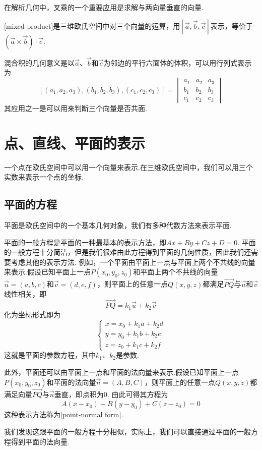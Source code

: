 在解析几何中，叉乘的一个重要应用是求解与两向量垂直的向量.
\begin{definition}[向量的混合积]
    [mixed product]是三维欧氏空间中对三个向量的运算，用$[\vec{a},\vec{b},\vec{c}]$表示，等价于$(\vec{a}\times\vec{b})\cdot\vec{c}$.
\end{definition}
混合积的几何意义是以$\vec{a}$、$\vec{b}$和$\vec{c}$为邻边的平行六面体的体积，可以用行列式表示为
$$[(a_1,a_2,a_3),(b_1,b_2,b_3),(c_1,c_2,c_3)]=\begin{vmatrix}
    a_1&a_2&a_3\\
    b_1&b_2&b_3\\
    c_1&c_2&c_3
\end{vmatrix}$$
其应用之一是可以用来判断三个向量是否共面.
\section{点、直线、平面的表示}
一个点在欧氏空间中可以用一个向量来表示.在三维欧氏空间中，我们可以用三个实数来表示一个点的坐标.

\subsection{平面的方程}
平面是欧氏空间中的一个基本几何对象，我们有多种代数方法来表示平面.

平面的一般方程是平面的一种最基本的表示方法，即$Ax+By+Cz+D=0$.
平面的一般方程十分简洁，但是我们很难由此方程得到平面的几何性质，因此我们还需要考虑其他的表示方法.
例如，一个平面由平面上一点与平面上两个不共线的向量来表示.假设已知平面上一点$P(x_0,y_0,z_0)$和平面上两个不共线的向量$\vec{u}=(a,b,c)$和$\vec{v}=(d,e,f)$，则平面上的任意一点$Q(x,y,z)$都满足$\vec{PQ}$与$\vec{u}$和$\vec{v}$线性相关，即
$$\vec{PQ}=k_1\vec{u}+k_2\vec{v}$$
化为坐标形式即为
$$\begin{cases}
    x=x_0+k_1a+k_2d\\
    y=y_0+k_1b+k_2e\\
    z=z_0+k_1c+k_2f
\end{cases}$$
这就是平面的参数方程，其中$k_1$、$k_2$是参数.

此外，平面还可以由平面上一点和平面的法向量来表示.假设已知平面上一点$P(x_0,y_0,z_0)$和平面的法向量$\vec{n}=(A,B,C)$，则平面上的任意一点$Q(x,y,z)$都满足向量$\vec{PQ}$与$\vec{n}$垂直，即点积为$0$.
由此可得其方程为$$A(x-x_0)+B(y-y_0)+C(z-z_0)=0$$这种表示方法称为[point-normal form].

我们发现这跟平面的一般方程十分相似，实际上，我们可以直接通过平面的一般方程得到平面的法向量.

